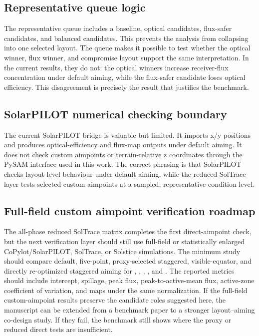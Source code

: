 \documentclass[final,3p,times]{elsarticle}
\begin{document}
\subsection{Representative queue logic}
The representative queue includes a baseline, optical candidates, flux-safer candidates, and balanced candidates. This prevents the analysis from collapsing into one selected layout. The queue makes it possible to test whether the optical winner, flux winner, and compromise layout support the same interpretation. In the current results, they do not: the optical winners increase receiver-flux concentration under default aiming, while the flux-safer candidate loses optical efficiency. This disagreement is precisely the result that justifies the benchmark.

\subsection{SolarPILOT numerical checking boundary}
The current SolarPILOT bridge is valuable but limited. It imports x/y positions and produces optical-efficiency and flux-map outputs under default aiming. It does not check custom aimpoints or terrain-relative z coordinates through the PySAM interface used in this work. The correct phrasing is that SolarPILOT checks layout-level behaviour under default aiming, while the reduced SolTrace layer tests selected custom aimpoints at a sampled, representative-condition level.

\subsection{Full-field custom aimpoint verification roadmap}
The all-phase reduced SolTrace matrix completes the first direct-aimpoint check, but the next verification layer should still use full-field or statistically enlarged CoPylot/SolarPILOT, SolTrace, or Solstice simulations. The minimum study should compare default, five-point, proxy-selected staggered, visible-equator, and directly re-optimized staggered aiming for , , , , and . The reported metrics should include intercept, spillage, peak flux, peak-to-active-mean flux, active-zone coefficient of variation, and maps under the same normalization. If the full-field custom-aimpoint results preserve the candidate roles suggested here, the manuscript can be extended from a benchmark paper to a stronger layout--aiming co-design study. If they fail, the benchmark still shows where the proxy or reduced direct tests are insufficient.
\end{document}
